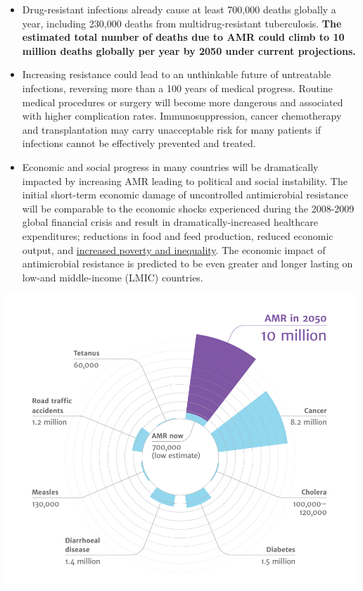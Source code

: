 \documentclass[
]{book}
\providecommand{\tightlist}{%
  \setlength{\itemsep}{0pt}\setlength{\parskip}{0pt}}
\begin{document}
\begin{itemize}
\tightlist
\item
  Drug-resistant infections already cause at least 700,000 deaths globally a year, including 230,000 deaths from multidrug-resistant tuberculosis. \textbf{The estimated total number of deaths due to AMR could climb to 10 million deaths globally per year by 2050 under current projections.}
\item
  Increasing resistance could lead to an unthinkable future of untreatable infections, reversing more than a 100 years of medical progress. Routine medical procedures or surgery will become more dangerous and associated with higher complication rates. Immunosuppression, cancer chemotherapy and transplantation may carry unacceptable risk for many patients if infections cannot be effectively prevented and treated.
\item
  Economic and social progress in many countries will be dramatically impacted by increasing AMR leading to political and social instability. The initial short-term economic damage of uncontrolled antimicrobial resistance will be comparable to the economic shocks experienced during the 2008-2009 global financial crisis and result in dramatically-increased healthcare expenditures; reductions in food and feed production, reduced economic output, and \href{https://documents.worldbank.org/en/publication/documents-reports/documentdetail/323311493396993758/final-report}{increased poverty and inequality}. The economic impact of antimicrobial resistance is predicted to be even greater and longer lasting on low-and middle-income (LMIC) countries.
\end{itemize}

\includegraphics[width=5.20833in,height=\textheight]{images/AMR_deaths_2050.png}
\end{document}

